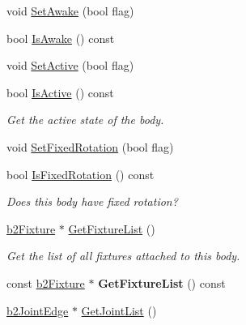 \begin{DoxyCompactItemize}
void \mbox{\hyperlink{classb2Body_ac72ed3df52a26c33db82252ab57399af}{Set\+Awake}} (bool flag)
\item 
bool \mbox{\hyperlink{classb2Body_a697f708427cdf7d31a626e80e694682c}{Is\+Awake}} () const
\item 
void \mbox{\hyperlink{classb2Body_ab8059b7b3e3b64aee17b54f68f7dde80}{Set\+Active}} (bool flag)
\item 
\mbox{\label{classb2Body_a825f37f457d3674ace96e2b8a9b4cae6}} 
bool \mbox{\hyperlink{classb2Body_a825f37f457d3674ace96e2b8a9b4cae6}{Is\+Active}} () const
\begin{DoxyCompactList}\small\item\em Get the active state of the body. \end{DoxyCompactList}\item 
void \mbox{\hyperlink{classb2Body_aff35078e2a221d2d05409674936cb8d2}{Set\+Fixed\+Rotation}} (bool flag)
\item 
\mbox{\label{classb2Body_a0920b7a770f7c876cf6d149e227036b5}} 
bool \mbox{\hyperlink{classb2Body_a0920b7a770f7c876cf6d149e227036b5}{Is\+Fixed\+Rotation}} () const
\begin{DoxyCompactList}\small\item\em Does this body have fixed rotation? \end{DoxyCompactList}\item 
\mbox{\label{classb2Body_a64634da20c6e0ab2d68a3cc9ea15efc3}} 
\mbox{\hyperlink{classb2Fixture}{b2\+Fixture}} $\ast$ \mbox{\hyperlink{classb2Body_a64634da20c6e0ab2d68a3cc9ea15efc3}{Get\+Fixture\+List}} ()
\begin{DoxyCompactList}\small\item\em Get the list of all fixtures attached to this body. \end{DoxyCompactList}\item 
\mbox{\label{classb2Body_ae232293cb940477443434c5e846607e3}} 
const \mbox{\hyperlink{classb2Fixture}{b2\+Fixture}} $\ast$ {\bfseries Get\+Fixture\+List} () const
\item 
\mbox{\label{classb2Body_a55cf2eb851780599ca5c1f6f25a17e41}} 
\mbox{\hyperlink{structb2JointEdge}{b2\+Joint\+Edge}} $\ast$ \mbox{\hyperlink{classb2Body_a55cf2eb851780599ca5c1f6f25a17e41}{Get\+Joint\+List}} ()

\end{DoxyCompactItemize}
